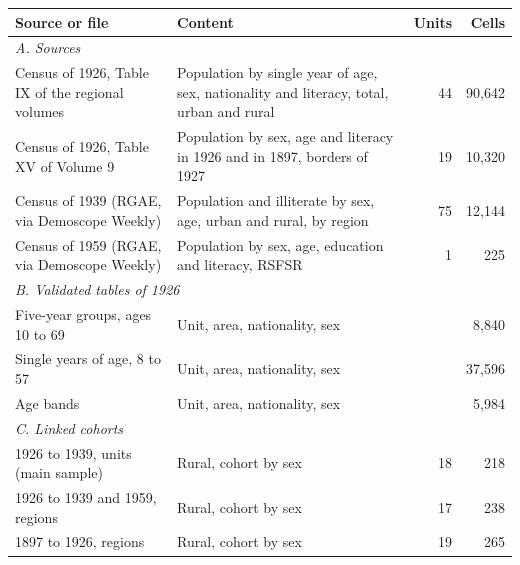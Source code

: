 \begin{tabular}{p{5.6cm}p{6.2cm}rr}
\toprule
Source or file & Content & Units & Cells \\
\midrule
\multicolumn{4}{l}{\textit{A. Sources}} \\
Census of 1926, Table IX of the regional volumes & Population by single year of age, sex, nationality and literacy, total, urban and rural & 44 & 90,642 \\
Census of 1926, Table XV of Volume 9 & Population by sex, age and literacy in 1926 and in 1897, borders of 1927 & 19 & 10,320 \\
Census of 1939 (RGAE, via Demoscope Weekly) & Population and illiterate by sex, age, urban and rural, by region & 75 & 12,144 \\
Census of 1959 (RGAE, via Demoscope Weekly) & Population by sex, age, education and literacy, RSFSR & 1 & 225 \\
\midrule
\multicolumn{4}{l}{\textit{B. Validated tables of 1926}} \\
Five-year groups, ages 10 to 69 & Unit, area, nationality, sex & & 8,840 \\
Single years of age, 8 to 57 & Unit, area, nationality, sex & & 37,596 \\
Age bands & Unit, area, nationality, sex & & 5,984 \\
\midrule
\multicolumn{4}{l}{\textit{C. Linked cohorts}} \\
1926 to 1939, units (main sample) & Rural, cohort by sex & 18 & 218 \\
1926 to 1939 and 1959, regions & Rural, cohort by sex & 17 & 238 \\
1897 to 1926, regions & Rural, cohort by sex & 19 & 265 \\
\bottomrule
\end{tabular}
